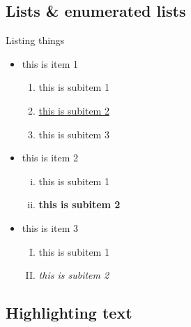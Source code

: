 \documentclass[handout]{beamer} %
\begin{document}
\subsection{Lists \& enumerated lists}
\begin{frame}[t]{Listing things}
    \begin{itemize}
        \item this is item 1
        \begin{enumerate}
            \item this is subitem 1
            \item \underline{this is subitem 2}
            \item \alert{this is subitem 3}
        \end{enumerate} 
        \pause
        \item this is item 2
        \begin{enumerate}[(i)]
            \item {\color{red} this is subitem 1}
            \item \bf{this is subitem 2}
        \end{enumerate} 
        \item this is item 3
        \pause
        \begin{enumerate}[(I)]
            \item {\color{green} this is subitem 1}
            \item \it{this is subitem 2}
        \end{enumerate} 
    \end{itemize}
\end{frame}

\subsection{Highlighting text}
\end{document}
